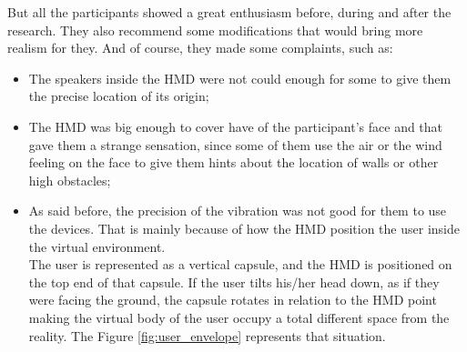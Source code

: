 But all the participants showed a great enthusiasm before, during and after the research. They also recommend some modifications that would bring more realism for they. And of course, they made some complaints, such as:

\begin{itemize}
    \item The speakers inside the HMD were not could enough for some to give them the precise location of its origin;
    \item The HMD was big enough to cover have of the participant’s face and that gave them a strange sensation, since some of them use the air or the wind feeling on the face to give them hints about the location of walls or other high obstacles;
    \item As said before, the precision of the vibration was not good for them to use the devices. That is mainly because of how the HMD position the user inside the virtual environment. \\
    The user is represented as a vertical capsule, and the HMD is positioned on the top end of that capsule. If the user tilts his/her head down, as if they were facing the ground, the capsule rotates in relation to the HMD point making the virtual body of the user occupy a total different space from the reality. The Figure \ref{fig:user_envelope} represents that situation. 


\end{itemize}
